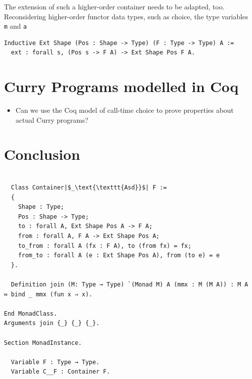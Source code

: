 \documentclass[a4paper, 11pt, fleqn, twoside]{scrreprt}
\newcommand{\hinl}[1]{\texttt{#1}}
\begin{document}
The extension of such a higher-order container needs to be adapted, too.
Reconsidering higher-order functor data types, such as choice, the type variables \hinl{m} and \hinl{a}

\begin{verbatim}
Inductive Ext Shape (Pos : Shape -> Type) (F : Type -> Type) A := 
  ext : forall s, (Pos s -> F A) -> Ext Shape Pos F A.
\end{verbatim}

\chapter{Curry Programs modelled in Coq}
\begin{itemize}
\item Can we use the Coq model of call-time choice to prove properties about actual Curry programs?
\end{itemize}

\chapter{Conclusion}

\begin{verbatim}

  Class Container|$_\text{\texttt{Asd}}$| F :=
  {
    Shape : Type;
    Pos : Shape -> Type;
    to : forall A, Ext Shape Pos A -> F A;
    from : forall A, F A -> Ext Shape Pos A;
    to_from : forall A (fx : F A), to (from fx) = fx;
    from_to : forall A (e : Ext Shape Pos A), from (to e) = e
  }.

  Definition join (M: Type → Type) `(Monad M) A (mmx : M (M A)) : M A ≔ bind _ mmx (fun x ⇒ x).

End MonadClass.
Arguments join {_} {_} {_}.

Section MonadInstance.

  Variable F : Type → Type.
  Variable C__F : Container F.


\end{verbatim}



\appendix
\end{document}
